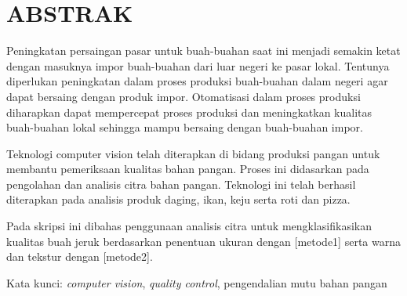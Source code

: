 \documentclass[laporan.tex]{subfiles}
\begin{document}
\chapter*{ABSTRAK}

Peningkatan persaingan pasar untuk buah-buahan saat ini menjadi semakin ketat dengan masuknya impor buah-buahan dari luar negeri ke pasar lokal. Tentunya diperlukan peningkatan dalam proses produksi buah-buahan dalam negeri agar dapat bersaing dengan produk impor. Otomatisasi dalam proses produksi diharapkan dapat mempercepat proses produksi dan meningkatkan kualitas buah-buahan lokal sehingga mampu bersaing dengan buah-buahan impor.

Teknologi computer vision telah diterapkan di bidang produksi pangan untuk membantu pemeriksaan kualitas bahan pangan. Proses ini didasarkan pada pengolahan dan analisis citra bahan pangan. Teknologi ini telah berhasil diterapkan pada analisis produk daging, ikan, keju serta roti dan pizza.

Pada skripsi ini dibahas penggunaan analisis citra untuk mengklasifikasikan kualitas buah jeruk berdasarkan penentuan ukuran dengan [metode1] serta warna dan tekstur dengan [metode2].

Kata kunci: \emph{computer vision}, \emph{quality control}, pengendalian mutu bahan pangan
\end{document}
